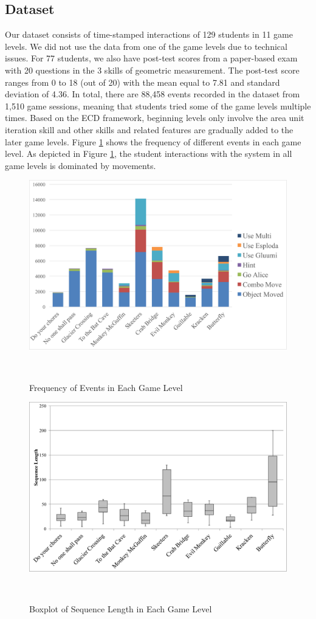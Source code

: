 \documentclass{sigchi}
\begin{document}
\subsection{Dataset} 
Our dataset consists of time-stamped interactions of 129 students in 11 game levels.
We did not use the data from one of the game levels due to technical issues.
For 77 students, we also have post-test scores from a paper-based exam with 20 questions in the 3 skills of geometric measurement.
The post-test score ranges from 0 to 18 (out of 20) with the mean equal to 7.81 and standard deviation of 4.36. 
In total, there are 88,458 events recorded in the dataset from 1,510 game sessions, meaning that students tried some of the game levels  multiple times.
Based on the ECD framework, beginning levels only involve the area unit iteration skill and other skills and related features are gradually added to the later game levels.
Figure \ref{fig:frequency} shows the frequency of different events in each game level. As depicted in Figure \ref{fig:frequency}, the student interactions with the system in all game levels is dominated by movements.

\begin{figure}
	\centering
	\includegraphics[width=0.9\columnwidth]{figures/frequency.pdf}
	\caption{Frequency of Events in Each Game Level}~\label{fig:frequency}
\end{figure}


\begin{figure}
	\centering
	\includegraphics[width=0.9\columnwidth]{figures/boxplot.pdf}
	\caption{Boxplot of Sequence Length in Each Game Level}~\label{fig:boxplot}
\end{figure}
\end{document}
